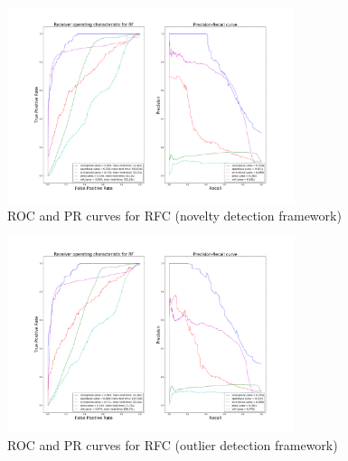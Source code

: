 \begin{figure}[!ht]
    \caption{\acs{ROC} and \acs{PR} curves for \acs{RFC} (novelty detection
    framework)}
    \label{ocrf:fig:rf_roc_pr}
    \centering
    \includegraphics[trim=175 80 175 123, clip,
    width=0.75\textwidth]{./gfx/bench_rf_roc_pr_supervised_factorized.png}
\end{figure}
\begin{figure}[!ht]
    \caption{\acs{ROC} and \acs{PR} curves for \acs{RFC} (outlier detection
    framework)}
    \label{ocrf:fig:rf_roc_pr_unsupervised}
    \centering
    \includegraphics[trim=175 80 175 123, clip,
    width=0.75\textwidth]{./gfx/bench_rf_roc_pr_unsupervised_factorized.png}
\end{figure}

